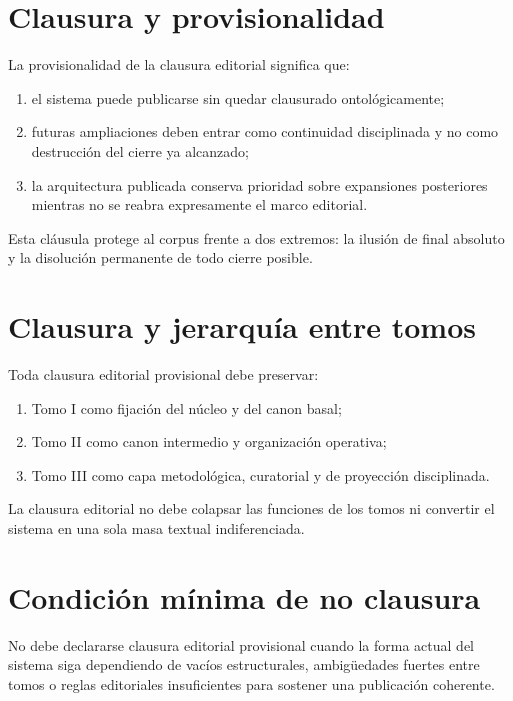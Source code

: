 \section{Clausura y provisionalidad}
\begin{definition}
La provisionalidad de la clausura editorial significa que:
\begin{enumerate}
  \item el sistema puede publicarse sin quedar clausurado ontológicamente;
  \item futuras ampliaciones deben entrar como continuidad disciplinada y no como destrucción del cierre ya alcanzado;
  \item la arquitectura publicada conserva prioridad sobre expansiones posteriores mientras no se reabra expresamente el marco editorial.
\end{enumerate}
\end{definition}

\begin{observation}
Esta cláusula protege al corpus frente a dos extremos: la ilusión de final absoluto y la disolución permanente de todo cierre posible.
\end{observation}

\section{Clausura y jerarquía entre tomos}
\begin{definition}
Toda clausura editorial provisional debe preservar:
\begin{enumerate}
  \item Tomo I como fijación del núcleo y del canon basal;
  \item Tomo II como canon intermedio y organización operativa;
  \item Tomo III como capa metodológica, curatorial y de proyección disciplinada.
\end{enumerate}
\end{definition}

\begin{observation}
La clausura editorial no debe colapsar las funciones de los tomos ni convertir el sistema en una sola masa textual indiferenciada.
\end{observation}

\section{Condición mínima de no clausura}
\begin{definition}
No debe declararse clausura editorial provisional cuando la forma actual del sistema siga dependiendo de vacíos estructurales, ambigüedades fuertes entre tomos o reglas editoriales insuficientes para sostener una publicación coherente.
\end{definition}

